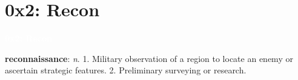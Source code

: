 \documentclass[aspectratio=169]{beamer}
\begin{document}
\section{0x2: Recon}

{
\begin{frame}
\huge{\textcolor{white}{\textbf{0x2: Recon}}}
\end{frame}
}


\begin{frame}%
    \textbf{reconnaissance}: \textit{n}. 1. Military observation of a region to locate an enemy or ascertain strategic features. 2. Preliminary surveying or research.
\end{frame}
\end{document}
